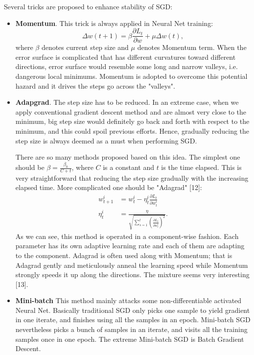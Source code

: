 \documentclass{article} %
\begin{document}
Several tricks are proposed to enhance stability of SGD:
\begin{itemize}
   \item {\bf Momentum}. This trick is always applied in Neural Net training:
   $$
   \Delta w(t+1) = \beta \frac{\partial L_t}{\partial w} + \mu \Delta w(t),
   $$
   where $\beta$ denotes current step size and $\mu$ denotes Momentum term. When the error surface is complicated that has different curvatures toward different directions, error surface would resemble some long and narrow valleys, i.e. dangerous local minimums. Momentum is adopted to overcome this potential hazard and it drives the steps go across the "valleys".

   \item {\bf Adapgrad}. The step size has to be reduced. 
In an extreme case, when we apply conventional gradient descent method and are almost very close to the minimum, big step size would definitely go back and forth with respect to the minimum, and this could spoil previous efforts. Hence, gradually reducing the step size is always deemed as a must when performing SGD.

   There are so many methods proposed based on this idea. The simplest one should be $ \beta = \frac{\beta_0}{C+t} $, where $C$ is a constant and $t$ is the time elapsed. This is very straightforward that reducing the step size gradually with the increasing elapsed time. More complicated one should be "Adagrad" [12]:
   \begin{align*}
      w_{t+1}^i &= w_{t}^i - \eta^i_t \frac{\partial L_{t}}{\partial w^i_t} \\
      \eta^i_t &= \frac{\eta}{\sqrt{\sum_{s=1}^t (\frac{\partial L_t}{\partial w^i_t})^2}}.
   \end{align*}
   As we can see, this method is operated in a component-wise fashion. Each parameter has its own adaptive learning rate and each of them are adapting to the component. Adagrad is often used along with Momentum; that is Adagrad gently and meticulously anneal the learning speed while Momentum strongly speeds it up along the directions. The mixture seems very interesting [13].

   \item {\bf Mini-batch} This method mainly attacks some non-differentiable activated Neural Net. Basically traditional SGD only picks one sample to yield gradient in one iterate, and finishes using all the samples in an epoch. Mini-batch SGD nevertheless picks a bunch of samples in an iterate, and visits all the training samples once in one epoch. The extreme Mini-batch SGD is Batch Gradient Descent. 


\end{itemize}
\end{document}
